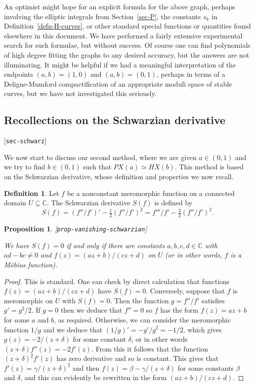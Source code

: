 \documentclass[reqno]{amsart}
\newcommand{\lbl}[1]{\label{#1}\textup{[\texttt{#1}]}\par}
\newcommand{\lbl}{\label}
\newcommand{\bt}        {\beta}
\newcommand{\gm}        {\gamma}
\newcommand{\dl}        {\delta}
\newcommand{\C}         {{\mathbb{C}}}
\newcommand{\sse}       {\subseteq}
\renewcommand{\:}{\colon}
\newtheorem{proposition}[theorem]{Proposition}
\theoremstyle{definition}
\newtheorem{definition}[theorem]{Definition}
\begin{document}
An optimist might hope for an explicit formula for the above graph,
perhaps involving the elliptic integrals from
Section~\ref{sec-P}, the constants $s_k$ in
Definition~\ref{defn-H-curves}, or other standard special
functions or quantities found elsewhere in this document.  We have
performed a fairly extensive experimental search for such formulae,
but without success.  Of course one can find polynomials of high
degree fitting the graphs to any desired accuracy, but the answers are
not illuminating.  It might be helpful if we had a meaningful
interpretation of the endpoints $(a,b)=(1,0)$ and $(a,b)=(0,1)$,
perhaps in terms of a Deligne-Mumford compactification of an
appropriate moduli space of stable curves, but we have not
investigated this seriously.

\subsection{Recollections on the Schwarzian derivative}
\lbl{sec-schwarz}

We now start to discuss our second method, where we are given
$a\in(0,1)$ and we try to find $b\in (0,1)$ such that
$PX(a)\simeq HX(b)$.  This method is based on the Schwarzian
derivative, whose definition and properties we now recall.

\begin{definition}
 Let $f$ be a nonconstant meromorphic function on a connected domain
 $U\sse\C$.  The Schwarzian derivative $S(f)$ is defined by
 \[ S(f) = (f''/f')' - \tfrac{1}{2} (f''/f')^2
         = f'''/f' - \tfrac{3}{2} (f''/f')^2.
 \]
\end{definition}

\begin{proposition}\lbl{prop-vanishing-schwarzian}
 We have $S(f)=0$ if and only if there are constants $a,b,c,d\in\C$
 with $ad-bc\neq 0$ and $f(z)=(az+b)/(cz+d)$ on $U$ (or in other
 words, $f$ is a M\"obius function).
\end{proposition}
\begin{proof}
 This is standard.  One can check by direct calculation that
 functions $f(z)=(az+b)/(cz+d)$ have $S(f)=0$.  Conversely, suppose
 that $f$ is meromorphic on $U$ with $S(f)=0$.  Then the function
 $g=f''/f'$ satisfies $g'=g^2/2$.  If $g=0$ then we deduce that
 $f''=0$ so $f$ has the form $f(z)=az+b$ for some $a$ and $b$, as
 required.  Otherwise, we can consider the meromorphic function $1/g$
 and we deduce that $(1/g)'=-g'/g^2=-1/2$, which gives
 $g(z)=-2/(z+\dl)$ for some constant $\dl$, or in other words
 $(z+\dl)f''(z)=-2f'(z)$.  From this it follows that the function
 $(z+\dl)^2f'(z)$ has zero derivative and so is constant.  This gives
 that $f'(z)=\gm/(z+\dl)^2$ and then $f(z)=\bt-\gm/(z+\dl)$ for some
 constants $\bt$ and $\dl$, and this can evidently be rewritten in the
 form $(az+b)/(cz+d)$.
\end{proof}
\end{document}
